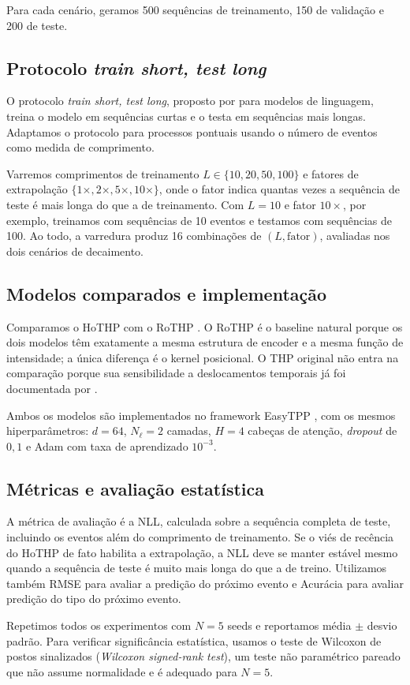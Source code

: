 Para cada cenário, geramos 500 sequências de treinamento, 150 de validação e 200 de teste.

\subsection{Protocolo \textit{train short, test long}}
\label{subsec:train-short-test-long}

O protocolo \textit{train short, test long}, proposto por  para modelos de linguagem, treina o modelo em sequências curtas e o testa em sequências mais longas. Adaptamos o protocolo para processos pontuais usando o número de eventos como medida de comprimento.

Varremos comprimentos de treinamento $L \in \{10, 20, 50, 100\}$ e fatores de extrapolação $\{1\times, 2\times, 5\times, 10\times\}$, onde o fator indica quantas vezes a sequência de teste é mais longa do que a de treinamento. Com $L = 10$ e fator $10\times$, por exemplo, treinamos com sequências de 10 eventos e testamos com sequências de 100. Ao todo, a varredura produz 16 combinações de $(L, \mathrm{fator})$, avaliadas nos dois cenários de decaimento.

\subsection{Modelos comparados e implementação}
\label{subsec:modelos-comparados}

Comparamos o HoTHP com o RoTHP \cite{gao_rothp_2024}. O RoTHP é o baseline natural porque os dois modelos têm exatamente a mesma estrutura de encoder e a mesma função de intensidade; a única diferença é o kernel posicional. O THP original não entra na comparação porque sua sensibilidade a deslocamentos temporais já foi documentada por .

Ambos os modelos são implementados no framework EasyTPP \cite{xue_easytpp_2024}, com os mesmos hiperparâmetros: $d = 64$, $N_{\ell} = 2$ camadas, $H = 4$ cabeças de atenção, \textit{dropout} de $0{,}1$ e Adam com taxa de aprendizado $10^{-3}$.

\subsection{Métricas e avaliação estatística}
\label{subsec:metricas}

A métrica de avaliação é a \gls{NLL}, calculada sobre a sequência completa de teste, incluindo os eventos além do comprimento de treinamento. Se o viés de recência do HoTHP de fato habilita a extrapolação, a NLL deve se manter estável mesmo quando a sequência de teste é muito mais longa do que a de treino. Utilizamos também RMSE para avaliar a predição do próximo evento e Acurácia para avaliar predição do tipo do próximo evento.

Repetimos todos os experimentos com $N = 5$ seeds e reportamos média $\pm$ desvio padrão. Para verificar significância estatística, usamos o teste de Wilcoxon de postos sinalizados (\textit{Wilcoxon signed-rank test}), um teste não paramétrico pareado que não assume normalidade e é adequado para $N = 5$.